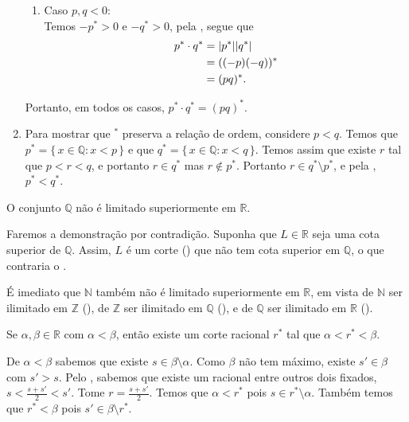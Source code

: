 \documentclass[../main.tex]{subfiles}
\begin{document}
\begin{dem}
\begin{enumerate}[label=(\roman*)]
\begin{enumerate}
            \item Caso $p,q < 0$: \\
            Temos $-p^* > 0$ e $-q^* > 0$, pela , segue que
            \begin{align*}
                p^* \cdot q^* 
                &= \abs{p^*}\abs{q^*} \\
                &= ((-p)(-q))^* \\
                &= (pq)^*.
            \end{align*}
        \end{enumerate}
        Portanto, em todos os casos, $p^* \cdot q^* = (pq)^*$.        

     \item Para mostrar que $^*$ preserva a relação de ordem, considere $p < q$. Temos que $p^* = \{\,x \in \mathbb{Q} : x< p\,\}$ e que 
     $q^* = \{\,x \in \mathbb{Q} : x< q \,\}$. Temos assim que existe $r$ tal que $p < r < q$, e portanto $r \in q^*$ mas $r \not\in p^*$. Portanto 
      $r \in q^* \setminus p^*$, e pela , $p^* < q^*$.
     
    \end{enumerate}
\end{dem}

\begin{teo}\label{reais-teo-ilimitadoSuperiormente}
    O conjunto $\mathbb{Q}$ não é limitado superiormente em $\mathbb{R}$.
\end{teo}
\begin{dem}
    Faremos a demonstração por contradição. Suponha que $L \in \mathbb{R}$ seja uma cota superior de $\mathbb{Q}$. Assim, $L$ é um corte () que não tem cota superior em $\mathbb{Q}$, o que contraria o . 
\end{dem}
\begin{obs}
    É imediato que $\mathbb{N}$ também não é limitado superiormente em $\mathbb{R}$, em vista de $\mathbb{N}$ ser ilimitado em $\mathbb{Z}$ (), de $\mathbb{Z}$ ser ilimitado em $\mathbb{Q}$ (), e de $\mathbb{Q}$ ser ilimitado em $\mathbb{R}$ ().
\end{obs}

\begin{prop}\label{reais-prop-entreDoisReaisHaUmTerceiro}
    Se $\alpha, \beta \in \mathbb{R}$ com $\alpha < \beta$, então existe um corte racional $r^*$ tal que $\alpha < r^* < \beta$.
\end{prop}
\begin{dem}
    De $\alpha < \beta$ sabemos que existe $s \in \beta \setminus \alpha$. Como $\beta$ não tem máximo, existe $s' \in \beta $ com $ s' > s$.
    Pelo , sabemos que existe um racional entre outros dois fixados, $s < \frac{s + s'}{2} < s'$. Tome $r = \frac{s+s'}{2}$. Temos que $\alpha < r^*$ pois $s \in r^* \setminus \alpha$. Também temos que $r^* < \beta$ pois $s' \in \beta \setminus r^*$. 
\end{dem}
\end{document}
